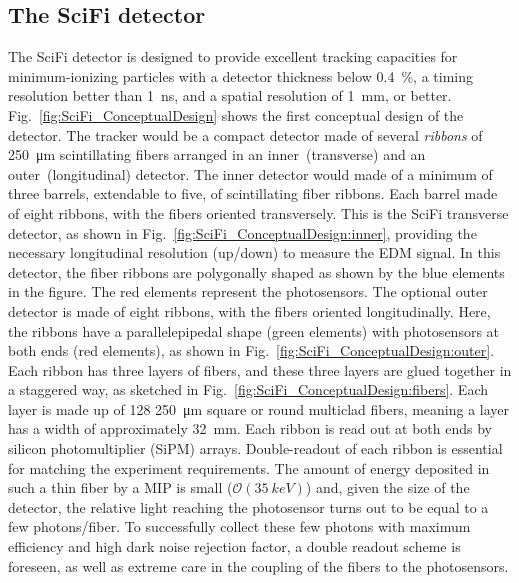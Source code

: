 \begin{refsection}
    \subsection{The SciFi detector}
        The SciFi detector is designed to provide excellent tracking capacities for minimum-ionizing particles with a detector thickness below \SI{0.4}{\%}, a timing resolution better than \SI{1}{ns}, and a spatial resolution of \SI{1}{mm}, or better.
        Fig.~\ref{fig:SciFi_ConceptualDesign} shows the first conceptual design of the detector. 
        The tracker would be a compact detector made of several \textit{ribbons} of \SI{250}{\micro m} scintillating fibers arranged in an inner~(transverse) and an outer~(longitudinal) detector.
        The inner detector would made of a minimum of three barrels, extendable to five, of scintillating fiber ribbons. Each barrel made of eight ribbons, with the fibers oriented transversely. 
        This is the SciFi transverse detector, as shown in Fig.~\ref{fig:SciFi_ConceptualDesign:inner}, providing the necessary longitudinal resolution (up/down) to measure the EDM signal. 
        In this detector, the fiber ribbons are polygonally shaped as shown by the blue elements in the figure. The red elements represent the photosensors. 
        The optional outer detector is made of eight ribbons, with the fibers oriented longitudinally. Here, the ribbons have a parallelepipedal shape (green elements) with photosensors at both ends (red elements), as shown in Fig.~\ref{fig:SciFi_ConceptualDesign:outer}. \\
        Each ribbon has three layers of fibers, and these three layers are glued together in a staggered way, as sketched in Fig.~\ref{fig:SciFi_ConceptualDesign:fibers}. Each layer is made up of 128 \SI{250}{\micro m} square or round multiclad fibers, meaning a layer has a width of approximately \SI{32}{mm}.
        Each ribbon is read out at both ends by silicon photomultiplier (SiPM) arrays. 
        Double-readout of each ribbon is essential for matching the experiment requirements.
        The amount of energy deposited in such a thin fiber by a MIP is small ($\mathcal{O}(\SI{35}{keV})$) and, given the size of the detector, the relative light reaching the photosensor turns out to be equal to a few photons/fiber. 
        To successfully collect these few photons with maximum efficiency and high dark noise rejection factor, a double readout scheme is foreseen, as well as extreme care in the coupling of the fibers to the photosensors.


\end{refsection}
